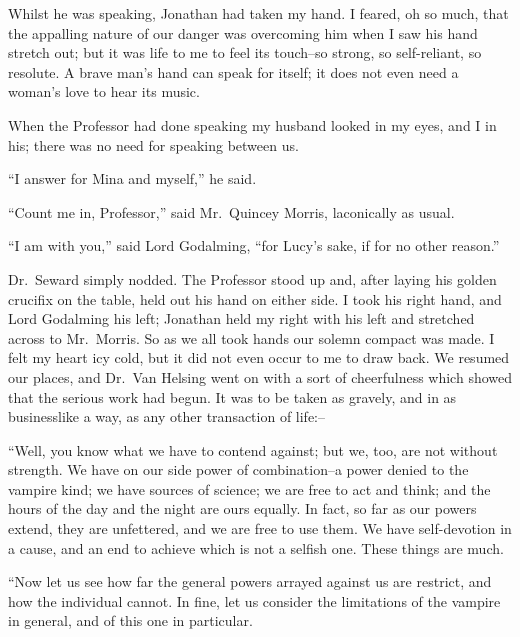 \documentclass[12pt,openright]{book}
\begin{document}
Whilst he was speaking, Jonathan had taken my hand. I feared, oh so much, that the appalling nature of our danger was overcoming him when I saw his hand stretch out; but it was life to me to feel its touch–so strong, so self-reliant, so resolute. A brave man’s hand can speak for itself; it does not even need a woman’s love to hear its music.

When the Professor had done speaking my husband looked in my eyes, and I in his; there was no need for speaking between us.

“I answer for Mina and myself,” he said.

“Count me in, Professor,” said Mr. Quincey Morris, laconically as usual.

“I am with you,” said Lord Godalming, “for Lucy’s sake, if for no other reason.”

Dr. Seward simply nodded. The Professor stood up and, after laying his golden crucifix on the table, held out his hand on either side. I took his right hand, and Lord Godalming his left; Jonathan held my right with his left and stretched across to Mr. Morris. So as we all took hands our solemn compact was made. I felt my heart icy cold, but it did not even occur to me to draw back. We resumed our places, and Dr. Van Helsing went on with a sort of cheerfulness which showed that the serious work had begun. It was to be taken as gravely, and in as businesslike a way, as any other transaction of life:–

“Well, you know what we have to contend against; but we, too, are not without strength. We have on our side power of combination–a power denied to the vampire kind; we have sources of science; we are free to act and think; and the hours of the day and the night are ours equally. In fact, so far as our powers extend, they are unfettered, and we are free to use them. We have self-devotion in a cause, and an end to achieve which is not a selfish one. These things are much.

“Now let us see how far the general powers arrayed against us are restrict, and how the individual cannot. In fine, let us consider the limitations of the vampire in general, and of this one in particular.
\end{document}
